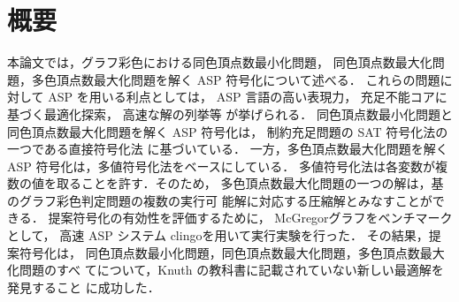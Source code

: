 \chapter*{概要}

本論文では，グラフ彩色における同色頂点数最小化問題，
同色頂点数最大化問題，多色頂点数最大化問題を解く
ASP 符号化について述べる．
これらの問題に対して ASP を用いる利点としては，
ASP 言語の高い表現力，
充足不能コアに基づく最適化探索，
高速な解の列挙等
が挙げられる．
同色頂点数最小化問題と同色頂点数最大化問題を解く ASP 符号化は，
制約充足問題の SAT 符号化法の一つである直接符号化法
に基づいている．
一方，多色頂点数最大化問題を解くASP 符号化は，多値符号化法をベースにしている．
多値符号化法は各変数が複数の値を取ることを許す．そのため，
多色頂点数最大化問題の一つの解は，基のグラフ彩色判定問題の複数の実行可
能解に対応する圧縮解とみなすことができる．
提案符号化の有効性を評価するために，
\textsf{McGregor}グラフをベンチマークとして，
高速 ASP システム \textsf{clingo}を用いて実行実験を行った．
その結果，提案符号化は，
同色頂点数最小化問題，同色頂点数最大化問題，多色頂点数最大化問題のすべ
てについて，Knuth の教科書に記載されていない新しい最適解を発見すること
に成功した．

